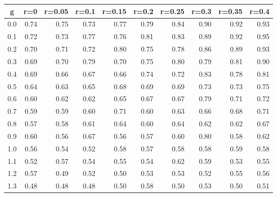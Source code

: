 %
\begin{table}[!tbp]
 \begin{center}
 \begin{tabular}{rrrrrrrrrr}\hline\hline
\multicolumn{1}{c}{g}&\multicolumn{1}{c}{r=0}&\multicolumn{1}{c}{r=0.05}&\multicolumn{1}{c}{r=0.1}&\multicolumn{1}{c}{r=0.15}&\multicolumn{1}{c}{r=0.2}&\multicolumn{1}{c}{r=0.25}&\multicolumn{1}{c}{r=0.3}&\multicolumn{1}{c}{r=0.35}&\multicolumn{1}{c}{r=0.4}\tabularnewline
\hline
0.0&0.74&0.75&0.73&0.77&0.79&0.84&0.90&0.92&0.93\tabularnewline
0.1&0.72&0.73&0.77&0.76&0.81&0.83&0.89&0.92&0.95\tabularnewline
0.2&0.70&0.71&0.72&0.80&0.75&0.78&0.86&0.89&0.93\tabularnewline
0.3&0.69&0.70&0.79&0.70&0.75&0.80&0.79&0.81&0.90\tabularnewline
0.4&0.69&0.66&0.67&0.66&0.74&0.72&0.83&0.78&0.81\tabularnewline
0.5&0.64&0.63&0.65&0.68&0.69&0.69&0.73&0.73&0.75\tabularnewline
0.6&0.60&0.62&0.62&0.65&0.67&0.67&0.79&0.71&0.72\tabularnewline
0.7&0.59&0.59&0.60&0.71&0.60&0.63&0.66&0.68&0.71\tabularnewline
0.8&0.57&0.58&0.61&0.64&0.60&0.64&0.62&0.62&0.67\tabularnewline
0.9&0.60&0.56&0.67&0.56&0.57&0.60&0.80&0.58&0.62\tabularnewline
1.0&0.56&0.54&0.52&0.58&0.57&0.58&0.58&0.59&0.58\tabularnewline
1.1&0.52&0.57&0.54&0.55&0.54&0.62&0.59&0.53&0.55\tabularnewline
1.2&0.57&0.49&0.52&0.50&0.53&0.53&0.52&0.55&0.56\tabularnewline
1.3&0.48&0.48&0.48&0.50&0.58&0.50&0.53&0.50&0.51\tabularnewline
\hline
\end{tabular}

\end{center}

\end{table}


